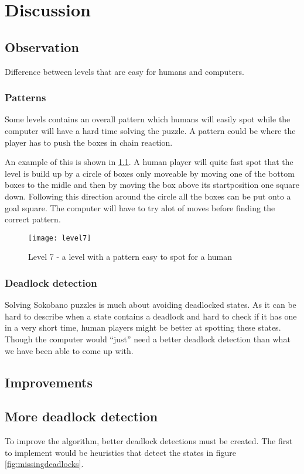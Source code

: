 
\chapter{Discussion}
\label{cha:discussion}

\section{Observation}
Difference between levels that are easy for humans and computers.

\subsection{Patterns}
Some levels contains an overall pattern which humans will easily spot while the computer will have a hard time solving the puzzle. A pattern could be where the player has to push the boxes in chain reaction.

An example of this is shown in \ref{fig:level7}. A human player will quite fast spot that the level is build up by a circle of boxes only moveable by moving one of the bottom boxes to the midle and then by moving the box above its startposition one square down. Following this direction around the circle all the boxes can be put onto a goal square. The computer will have to try alot of moves before finding the correct pattern.

\begin{figure}[htp]
	\centering
	\texttt{[image: level7]}
	\caption{Level 7 - a level with a pattern easy to spot for a human}
	\label{fig:level7}
\end{figure}

\subsection{Deadlock detection}
Solving Sokobano puzzles is much about avoiding deadlocked states. As
it can be hard to describe when a state contains a deadlock and hard
to check if it has one in a very short time, human players might be
better at spotting these states. Though the computer would ``just''
need a better deadlock detection than what we have been able to come
up with.

\section{Improvements}
\section{More deadlock detection}
To improve the algorithm, better deadlock detections must be
created. The first to implement would be heuristics that detect the
states in figure \ref{fig:missingdeadlocks}.

